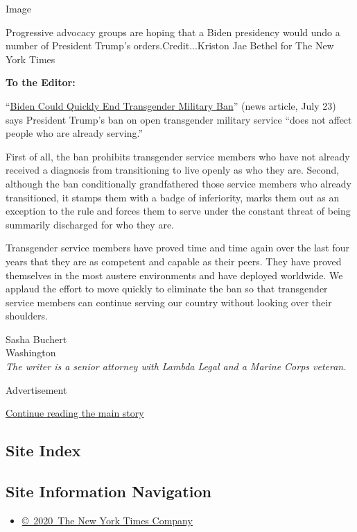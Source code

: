 Image

Progressive advocacy groups are hoping that a Biden presidency would
undo a number of President Trump's orders.Credit...Kriston Jae Bethel
for The New York Times

\textbf{To the Editor:}

``\href{https://www.nytimes.com/2020/07/22/us/politics/military-transgender-trump-biden.html}{Biden
Could Quickly End Transgender Military Ban}'' (news article, July 23)
says President Trump's ban on open transgender military service ``does
not affect people who are already serving.''

First of all, the ban prohibits transgender service members who have not
already received a diagnosis from transitioning to live openly as who
they are. Second, although the ban conditionally grandfathered those
service members who already transitioned, it stamps them with a badge of
inferiority, marks them out as an exception to the rule and forces them
to serve under the constant threat of being summarily discharged for who
they are.

Transgender service members have proved time and time again over the
last four years that they are as competent and capable as their peers.
They have proved themselves in the most austere environments and have
deployed worldwide. We applaud the effort to move quickly to eliminate
the ban so that transgender service members can continue serving our
country without looking over their shoulders.

Sasha Buchert\\
Washington\\
\emph{The writer is a senior attorney with Lambda Legal and a Marine
Corps veteran.}

Advertisement

\protect\hyperlink{after-bottom}{Continue reading the main story}

\hypertarget{site-index}{%
\subsection{Site Index}\label{site-index}}

\hypertarget{site-information-navigation}{%
\subsection{Site Information
Navigation}\label{site-information-navigation}}

\begin{itemize}
\tightlist
\item
  \href{https://help.nytimes.com/hc/en-us/articles/115014792127-Copyright-notice}{©~2020~The
  New York Times Company}
\end{itemize}

